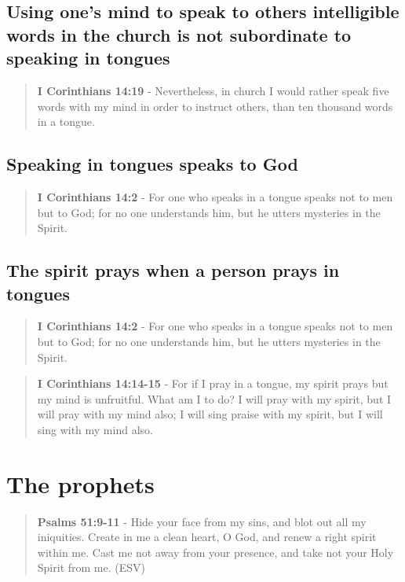 \documentclass[11pt]{article}
\begin{document}
\subsection{Using one's mind to speak to others intelligible words in the church is not subordinate to speaking in tongues}
\label{sec:org96d63c3}
\begin{quote}
\textbf{I Corinthians 14:19} - Nevertheless, in church I would rather speak five words with my mind in order to instruct others, than ten thousand words in a tongue.
\end{quote}

\subsection{Speaking in tongues speaks to God}
\label{sec:orge9b42a5}
\begin{quote}
\textbf{I Corinthians 14:2} - For one who speaks in a tongue speaks not to men but to God; for no one understands him, but he utters mysteries in the Spirit.
\end{quote}

\subsection{The spirit prays when a person prays in tongues}
\label{sec:org169a45c}
\begin{quote}
\textbf{I Corinthians 14:2} - For one who speaks in a tongue speaks not to men but to God; for no one understands him, but he utters mysteries in the Spirit.
\end{quote}

\begin{quote}
\textbf{I Corinthians 14:14-15} - For if I pray in a tongue, my spirit prays but my mind is unfruitful. What am I to do? I will pray with my spirit, but I will pray with my mind also; I will sing praise with my spirit, but I will sing with my mind also.
\end{quote}

\section{The prophets}
\label{sec:orgbfc3ad5}
\begin{quote}
\textbf{Psalms 51:9-11} - Hide your face from my sins, and blot out all my iniquities. Create in me a clean heart, O God, and renew a right spirit within me. Cast me not away from your presence, and take not your Holy Spirit from me. (ESV)
\end{quote}
\end{document}
